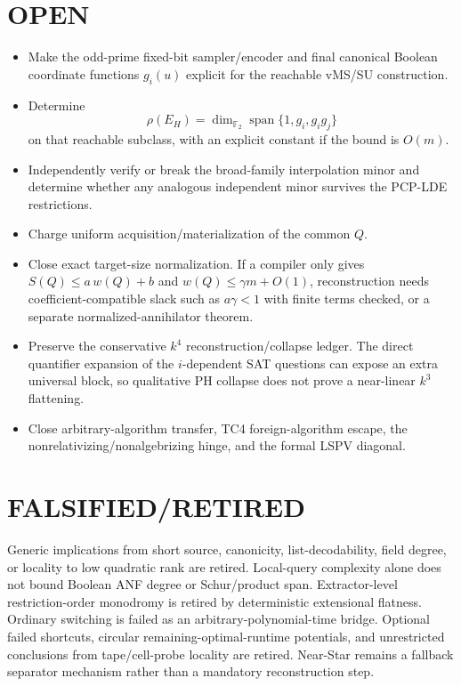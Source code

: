 \documentclass[11pt]{article}
\begin{document}
\section*{OPEN}
\begin{itemize}
\item Make the odd-prime fixed-bit sampler/encoder and final canonical Boolean coordinate functions $g_i(u)$ explicit for the reachable vMS/SU construction.
\item Determine
\[
\rho(E_H)=\dim_{\mathbb F_2}\operatorname{span}\{1,g_i,g_i g_j\}
\]
on that reachable subclass, with an explicit constant if the bound is $O(m)$.
\item Independently verify or break the broad-family interpolation minor and determine whether any analogous independent minor survives the PCP-LDE restrictions.
\item Charge uniform acquisition/materialization of the common $Q$.
\item Close exact target-size normalization. If a compiler only gives $S(Q)\le a\,w(Q)+b$ and $w(Q)\le \gamma m+O(1)$, reconstruction needs coefficient-compatible slack such as $a\gamma<1$ with finite terms checked, or a separate normalized-annihilator theorem.
\item Preserve the conservative $k^4$ reconstruction/collapse ledger. The direct quantifier expansion of the $i$-dependent SAT questions can expose an extra universal block, so qualitative PH collapse does not prove a near-linear $k^3$ flattening.
\item Close arbitrary-algorithm transfer, TC4 foreign-algorithm escape, the nonrelativizing/nonalgebrizing hinge, and the formal LSPV diagonal.
\end{itemize}

\section*{FALSIFIED/RETIRED}
Generic implications from short source, canonicity, list-decodability, field degree, or locality to low quadratic rank are retired. Local-query complexity alone does not bound Boolean ANF degree or Schur/product span. Extractor-level restriction-order monodromy is retired by deterministic extensional flatness. Ordinary switching is failed as an arbitrary-polynomial-time bridge. Optional failed shortcuts, circular remaining-optimal-runtime potentials, and unrestricted conclusions from tape/cell-probe locality are retired. Near-Star remains a fallback separator mechanism rather than a mandatory reconstruction step.
\end{document}
